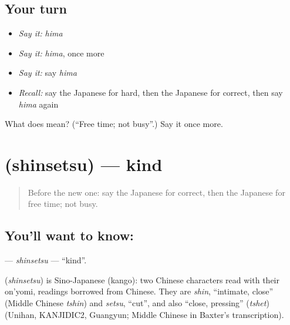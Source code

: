 \subsection*{Your turn}
\begin{itemize}
\raggedright
  \item \emph{Say it:} \emph{hima}
  \item \emph{Say it:} \emph{hima}, once more
  \item \emph{Say it:} say \emph{hima}
  \item \emph{Recall:} say the Japanese for hard, then the Japanese for correct, then say \emph{hima} again
\end{itemize}

\begin{tcolorbox}[breakable,colback=teal!4,colframe=teal!35!black,title={Before you move on}]
What does  mean? (\textquotedblleft{}Free time; not busy\textquotedblright{}.) Say it once more.
\end{tcolorbox}
\section[\texorpdfstring{\ja{しんせつ} (shinsetsu)}{しんせつ (shinsetsu)}]{ (shinsetsu) — kind}

\label{lesson:JA-C120-shinsetsu}



\begin{quote}
Before the new one: say the Japanese for correct, then the Japanese for free time; not busy.
\end{quote}

\subsection*{You'll want to know: }
\textbf{} — \emph{shinsetsu} — \textquotedblleft{}kind\textquotedblright{}.

\begin{cousinweb}
\textbf{} (\emph{shinsetsu}) is Sino-Japanese (kango): two Chinese characters read with their on'yomi, readings borrowed from Chinese. They are \emph{shin}, \textquotedblleft{}intimate, close\textquotedblright{} (Middle Chinese \emph{tshin}) and \emph{setsu}, \textquotedblleft{}cut\textquotedblright{}, and also \textquotedblleft{}close, pressing\textquotedblright{} (\emph{tshet}) (Unihan, KANJIDIC2, Guangyun; Middle Chinese in Baxter's transcription).
\end{cousinweb}


